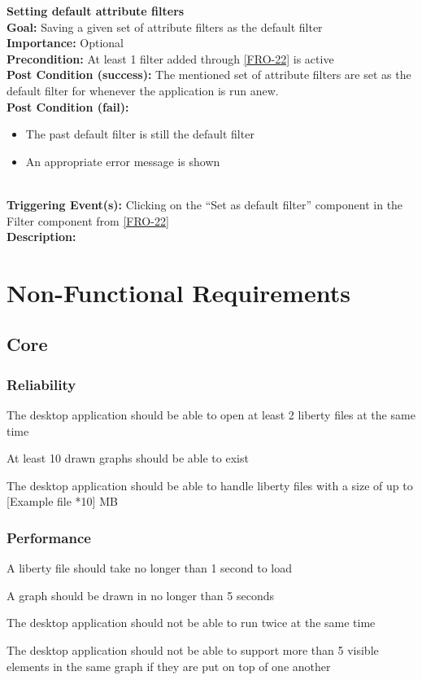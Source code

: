 \documentclass[10pt,a4paper]{report}
\newcommand{\precondition}[1]{
    \textbf{Precondition: } #1 \leavevmode \\
}
\newcommand{\FRODescription}[8]{
    \textbf{#1} \leavevmode \\
    \textbf{Goal: } #2 \leavevmode \\
    \textbf{Importance: } #3 \leavevmode \\
    \precondition{#4}
    \textbf{Post Condition (success): } #5 \leavevmode \\
    \textbf{Post Condition (fail): } #6 \leavevmode \\
    \textbf{Triggering Event(s): } #7 \leavevmode \\
    \textbf{Description: } \leavevmode \\
    #8}
\begin{document}
\begin{FRO}
    \item \FRODescription{Setting default attribute filters}
    {Saving a given set of attribute filters as the default filter}
    {Optional}
    {At least 1 filter added through \ref{FRO-22} is active}
    {The mentioned set of attribute filters are set as the default filter for whenever the application is run anew.}
    {\begin{itemize}
        \item The past default filter is still the default filter
        \item An appropriate error message is shown
    \end{itemize}}
    {Clicking on the “Set as default filter” component in the Filter component from \ref{FRO-22}}
\end{FRO}

\section{Non-Functional Requirements}
\subsection{Core}
\subsubsection{Reliability}
\begin{NFR-Rel}
    \item The desktop application should be able to open at least 2 liberty files at the same time
    \item At least 10 drawn graphs should be able to exist
    \item The desktop application should be able to handle liberty files with a size of up to [Example file *10] MB
\end{NFR-Rel}

\subsubsection{Performance}
\begin{NFR-Perf}
    \item A liberty file should take no longer than 1 second to load
    \item A graph should be drawn in no longer than 5 seconds
    \item The desktop application should not be able to run twice at the same time
    \item The desktop application should not be able to support more than 5 visible elements in the same graph if they are put on top of one another
\end{NFR-Perf}
\end{document}

